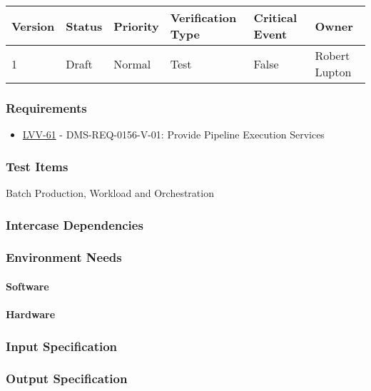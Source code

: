 \begin{longtable}[]{llllll}
\toprule
Version & Status & Priority & Verification Type & Critical Event & Owner
\\\midrule
1 & Draft & Normal &
Test & False & Robert Lupton
\\\bottomrule
\end{longtable}

\subsubsection{Requirements}
\begin{itemize}
\item \href{https://jira.lsstcorp.org/browse/LVV-61}{LVV-61} - DMS-REQ-0156-V-01: Provide Pipeline Execution Services
\end{itemize}

\subsubsection{Test Items}
Batch Production, Workload and Orchestration~



\subsubsection{Intercase Dependencies}

\subsubsection{Environment Needs}

\paragraph{Software}

\paragraph{Hardware}

\subsubsection{Input Specification}

\subsubsection{Output Specification}

